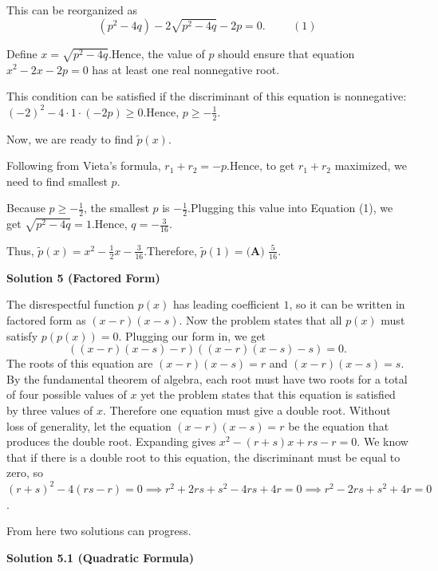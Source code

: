 \begin{enumerate}
 This can be reorganized as
 \[ \left( p^2 - 4 q \right) - 2 \sqrt{p^2 - 4 q} - 2 p = 0 . \hspace{1cm} (1) \]

 Define $x = \sqrt{p^2 - 4 q}$.Hence, the value of $p$ should ensure that equation $x^2 - 2 x - 2 p = 0$ has at least one real nonnegative root.

 This condition can be satisfied if the discriminant of this equation is nonnegative: $\left( -2 \right)^2 - 4 \cdot 1 \cdot \left( - 2 p \right) \geq 0$.Hence, $p \geq - \frac{1}{2}$.

 Now, we are ready to find $\tilde p \left( x \right)$.

 Following from Vieta's formula, $r_1 + r_2 = - p$.Hence, to get $r_1 + r_2$ maximized, we need to find smallest $p$.

 Because $p \geq - \frac{1}{2}$, the smallest $p$ is $-\frac{1}{2}$.Plugging this value into Equation (1), we get $\sqrt{p^2 - 4 q} = 1$.Hence, $q = - \frac{3}{16}$.

 Thus, $\tilde p \left( x \right) = x^2 - \frac{1}{2} x - \frac{3}{16}$.Therefore, $\tilde p \left( 1 \right) = \boxed{\textbf{(A) } \frac{5}{16}}$.

 



\textbf{Solution 5 (Factored Form)}

The disrespectful function $p(x)$ has leading coefficient $1$, so it can be written in factored form as $(x-r)(x-s)$. Now the problem states that all $p(x)$ must satisfy $p(p(x)) = 0$. Plugging our form in, we get 
 \[((x-r)(x-s)-r)((x-r)(x-s)-s) = 0.\] The roots of this equation are $(x-r)(x-s) = r$ and $(x-r)(x-s) = s$. By the fundamental theorem of algebra, each root must have two roots for a total of four possible values of $x$ yet the problem states that this equation is satisfied by three values of $x$. Therefore one equation must give a double root. Without loss of generality, let the equation $(x-r)(x-s) = r$ be the equation that produces the double root. Expanding gives $x^2-(r+s)x+rs-r = 0$. We know that if there is a double root to this equation, the discriminant must be equal to zero, so $(r+s)^2-4(rs-r) = 0 \implies r^2+2rs+s^2-4rs+4r = 0 \implies r^2-2rs+s^2+4r = 0$.

 From here two solutions can progress.

 



\textbf{Solution 5.1 (Quadratic Formula)}


\end{enumerate}
